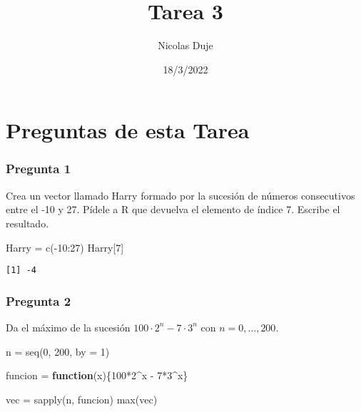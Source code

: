 \documentclass[
]{article}
\title{Tarea 3}
\author{Nicolas Duje}
\date{18/3/2022}
\newenvironment{Shaded}{\begin{snugshade}}{\end{snugshade}}
\newcommand{\AttributeTok}[1]{\textcolor[rgb]{0.77,0.63,0.00}{#1}}
\newcommand{\ControlFlowTok}[1]{\textcolor[rgb]{0.13,0.29,0.53}{\textbf{#1}}}
\newcommand{\DecValTok}[1]{\textcolor[rgb]{0.00,0.00,0.81}{#1}}
\newcommand{\FunctionTok}[1]{\textcolor[rgb]{0.00,0.00,0.00}{#1}}
\newcommand{\NormalTok}[1]{#1}
\newcommand{\OtherTok}[1]{\textcolor[rgb]{0.56,0.35,0.01}{#1}}
\newcommand{\SpecialCharTok}[1]{\textcolor[rgb]{0.00,0.00,0.00}{#1}}
\begin{document}
\maketitle

\hypertarget{preguntas-de-esta-tarea}{%
\section{Preguntas de esta Tarea}\label{preguntas-de-esta-tarea}}

\hypertarget{pregunta-1}{%
\subsubsection{Pregunta 1}\label{pregunta-1}}

Crea un vector llamado Harry formado por la sucesión de números
consecutivos entre el -10 y 27. Pídele a R que devuelva el elemento de
índice 7. Escribe el resultado.

\begin{Shaded}
\begin{Highlighting}[]
\NormalTok{Harry }\OtherTok{=} \FunctionTok{c}\NormalTok{(}\SpecialCharTok{{-}}\DecValTok{10}\SpecialCharTok{:}\DecValTok{27}\NormalTok{)}
\NormalTok{Harry[}\DecValTok{7}\NormalTok{]}
\end{Highlighting}
\end{Shaded}

\begin{verbatim}
[1] -4
\end{verbatim}

\hypertarget{pregunta-2}{%
\subsubsection{Pregunta 2}\label{pregunta-2}}

Da el máximo de la sucesión \(100\cdot 2^n -7\cdot3^n\) con
\(n=0,\dots,200\).

\begin{Shaded}
\begin{Highlighting}[]
\NormalTok{n }\OtherTok{=} \FunctionTok{seq}\NormalTok{(}\DecValTok{0}\NormalTok{, }\DecValTok{200}\NormalTok{, }\AttributeTok{by =} \DecValTok{1}\NormalTok{)}

\NormalTok{funcion }\OtherTok{=} \ControlFlowTok{function}\NormalTok{(x)\{}\DecValTok{100}\SpecialCharTok{*}\DecValTok{2}\SpecialCharTok{\^{}}\NormalTok{x }\SpecialCharTok{{-}} \DecValTok{7}\SpecialCharTok{*}\DecValTok{3}\SpecialCharTok{\^{}}\NormalTok{x\}}

\NormalTok{vec }\OtherTok{=} \FunctionTok{sapply}\NormalTok{(n, funcion)}
\FunctionTok{max}\NormalTok{(vec)}
\end{Highlighting}
\end{Shaded}
\end{document}
